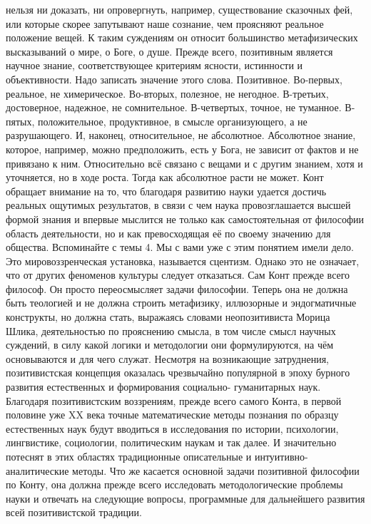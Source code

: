нельзя ни доказать, ни опровергнуть, например, существование сказочных фей, или
которые скорее запутывают наше сознание, чем проясняют реальное положение вещей.
К таким суждениям он относит большинство метафизических высказываний о мире, о
Боге, о душе. Прежде всего, позитивным является научное знание, соответствующее
критериям ясности, истинности и объективности. Надо записать значение этого
слова. Позитивное. Во-первых, реальное, не химерическое. Во-вторых, полезное, не
негодное. В-третьих, достоверное, надежное, не сомнительное. В-четвертых,
точное, не туманное. В-пятых, положительное, продуктивное, в смысле
организующего, а не разрушающего. И, наконец, относительное, не абсолютное.
Абсолютное знание, которое, например, можно предположить, есть у Бога, не
зависит от фактов и не привязано к ним. Относительно всё связано с вещами и с
другим знанием, хотя и уточняется, но в ходе роста. Тогда как абсолютное расти
не может. Конт обращает внимание на то, что благодаря развитию науки удается
достичь реальных ощутимых результатов, в связи с чем наука провозглашается
высшей формой знания и впервые мыслится не только как самостоятельная от
философии область деятельности, но и как превосходящая её по своему значению для
общества. Вспоминайте с темы 4. Мы с вами уже с этим понятием имели дело. Это
мировоззренческая установка, называется сцентизм. Однако это не означает, что от
других феноменов культуры следует отказаться. Сам Конт прежде всего философ. Он
просто переосмысляет задачи философии. Теперь она не должна быть теологией и не
должна строить метафизику, иллюзорные и эндогматичные конструкты, но должна
стать, выражаясь словами неопозитивиста Морица Шлика, деятельностью по
прояснению смысла, в том числе смысл научных суждений, в силу какой логики и
методологии они формулируются, на чём основываются и для чего служат. Несмотря
на возникающие затруднения, позитивистская концепция оказалась чрезвычайно
популярной в эпоху бурного развития естественных и формирования социально-
гуманитарных наук. Благодаря позитивистским воззрениям, прежде всего самого
Конта, в первой половине уже XX века точные математические методы познания по
образцу естественных наук будут вводиться в исследования по истории, психологии,
лингвистике, социологии, политическим наукам и так далее. И значительно потеснят
в этих областях традиционные описательные и интуитивно-аналитические методы. Что
же касается основной задачи позитивной философии по Конту, она должна прежде
всего исследовать методологические проблемы науки и отвечать на следующие
вопросы, программные для дальнейшего развития всей позитивистской традиции.
